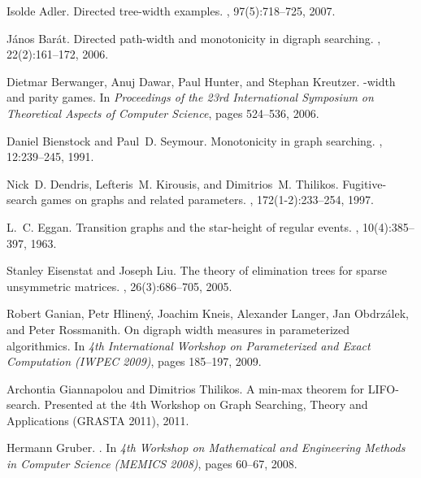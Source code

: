 \documentclass{llncs}
\begin{document}

\begin{thebibliography}{10}

Isolde Adler.
\newblock Directed tree-width examples.
, 97(5):718--725,
  2007.

J{\'a}nos Bar{\'a}t.
\newblock Directed path-width and monotonicity in digraph searching.
, 22(2):161--172, 2006.

Dietmar Berwanger, Anuj Dawar, Paul Hunter, and Stephan Kreutzer.
-width and parity games.
\newblock In {\em Proceedings of the 23rd International Symposium on
  Theoretical Aspects of Computer Science}, pages 524--536, 2006.

Daniel Bienstock and Paul~D. Seymour.
\newblock Monotonicity in graph searching.
, 12:239--245, 1991.

Nick~D. Dendris, Lefteris~M. Kirousis, and Dimitrios~M. Thilikos.
\newblock Fugitive-search games on graphs and related parameters.
, 172(1-2):233--254, 1997.

L.~C. Eggan.
\newblock Transition graphs and the star-height of regular events.
, 10(4):385--397, 1963.

Stanley Eisenstat and Joseph Liu.
\newblock The theory of elimination trees for sparse unsymmetric matrices.
,
  26(3):686--705, 2005.

Robert Ganian, Petr Hlinen{\'y}, Joachim Kneis, Alexander Langer, Jan
  Obdrz{\'a}lek, and Peter Rossmanith.
\newblock On digraph width measures in parameterized algorithmics.
\newblock In {\em 4th International Workshop on Parameterized and Exact
  Computation (IWPEC 2009)}, pages 185--197, 2009.

Archontia Giannapolou and Dimitrios Thilikos.
\newblock A min-max theorem for {LIFO}-search.
\newblock Presented at the 4th Workshop on Graph Searching, Theory and
  Applications (GRASTA 2011), 2011.

Hermann Gruber.
.
\newblock In {\em 4th Workshop on Mathematical and Engineering Methods in
  Computer Science (MEMICS 2008)}, pages 60--67, 2008.


\end{thebibliography}
\end{document}
